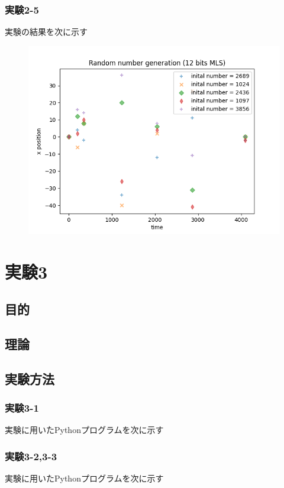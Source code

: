 \documentclass[xelatex,ja=standard]{bxjsarticle}
\begin{document}
\subsubsection{実験2-5}
実験の結果を次に示す
\begin{figure}[htbp]
    \centering
    \includegraphics[scale=0.7]
{5.png}
    \label{fig:1}
\end{figure}

\section{実験3}

\subsection{目的}

\subsection{理論}

\subsection{実験方法}

\subsubsection{実験3-1}
実験に用いたPythonプログラムを次に示す


\subsubsection{実験3-2,3-3}
実験に用いたPythonプログラムを次に示す

\end{document}
